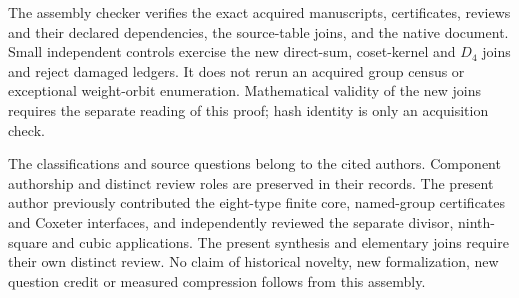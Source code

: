 \documentclass[11pt,a4paper]{article}
\begin{document}
The assembly checker verifies the exact acquired manuscripts, certificates,
reviews and their declared dependencies, the source-table joins, and the
native document. Small independent controls exercise the new direct-sum,
coset-kernel and $D_4$ joins and reject damaged ledgers. It does not rerun an
acquired group census or exceptional weight-orbit enumeration. Mathematical
validity of the new joins requires the separate reading of this proof;
hash identity is only an acquisition check.

The classifications and source questions belong to the cited authors.
Component authorship and distinct review roles are preserved in their
records. The present author previously contributed the eight-type finite
core, named-group certificates and Coxeter interfaces, and independently
reviewed the separate divisor, ninth-square and cubic applications.
The present synthesis and elementary joins require their own distinct
review. No claim of historical novelty, new formalization, new question
credit or measured compression follows from this assembly.
\end{document}
